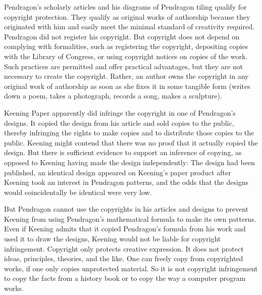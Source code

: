\documentclass[
  ignorenonframetext,
  aspectratio=169]{beamer}
\begin{document}
\begin{frame}{}
\protect\hypertarget{section-9}{}
Pendragon's scholarly articles and his diagrams of Pendragon tiling
qualify for copyright protection. They qualify as original works of
authorship because they originated with him and easily meet the minimal
standard of creativity required. Pendragon did not register his
copyright. But copyright does not depend on complying with formalities,
such as registering the copyright, depositing copies with the Library of
Congress, or using copyright notices on copies of the work. Such
practices are permitted and offer practical advantages, but they are not
necessary to create the copyright. Rather, an author owns the copyright
in any original work of authorship as soon as she fixes it in some
tangible form (writes down a poem, takes a photograph, records a song,
makes a sculpture).
\end{frame}

\begin{frame}{}
\protect\hypertarget{section-10}{}
Keening Paper apparently did infringe the copyright in one of
Pendragon's designs. It copied the design from his article and sold
copies to the public, thereby infringing the rights to make copies and
to distribute those copies to the public. Keening might contend that
there was no proof that it actually copied the design. But there is
sufficient evidence to support an inference of copying, as opposed to
Keening having made the design independently: The design had been
published, an identical design appeared on Keening's paper product after
Keening took an interest in Pendragon patterns, and the odds that the
designs would coincidentally be identical were very low.
\end{frame}

\begin{frame}{}
\protect\hypertarget{section-11}{}
But Pendragon cannot use the copyrights in his articles and designs to
prevent Keening from using Pendragon's mathematical formula to make its
own patterns. Even if Keening admits that it copied Pendragon's formula
from his work and used it to draw the designs, Keening would not be
liable for copyright infringement. Copyright only protects creative
expression. It does not protect ideas, principles, theories, and the
like. One can freely copy from copyrighted works, if one only copies
unprotected material. So it is not copyright infringement to copy the
facts from a history book or to copy the way a computer program works.
\end{frame}
\end{document}
